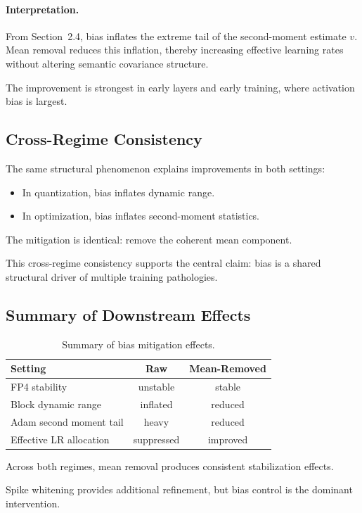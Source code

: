 \paragraph{Interpretation.}

From Section~2.4,
bias inflates the extreme tail of the second-moment estimate $v$.
Mean removal reduces this inflation,
thereby increasing effective learning rates
without altering semantic covariance structure.

The improvement is strongest in early layers and early training,
where activation bias is largest.

\subsection{Cross-Regime Consistency}

The same structural phenomenon explains improvements in both settings:

\begin{itemize}
    \item In quantization, bias inflates dynamic range.
    \item In optimization, bias inflates second-moment statistics.
\end{itemize}

The mitigation is identical:
remove the coherent mean component.

This cross-regime consistency supports the central claim:
bias is a shared structural driver of multiple training pathologies.

\subsection{Summary of Downstream Effects}

\begin{table}[t]
\centering
\caption{Summary of bias mitigation effects.}
\label{tab:downstream_summary}
\begin{tabular}{lcc}
\toprule
Setting & Raw & Mean-Removed \\
\midrule
FP4 stability & unstable & stable \\
Block dynamic range & inflated & reduced \\
Adam second moment tail & heavy & reduced \\
Effective LR allocation & suppressed & improved \\
\bottomrule
\end{tabular}
\end{table}

Across both regimes,
mean removal produces consistent stabilization effects.

Spike whitening provides additional refinement,
but bias control is the dominant intervention.